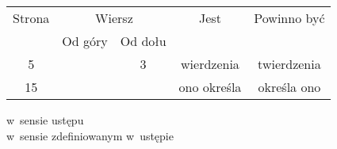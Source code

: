 \documentclass[a4paper,11pt]{article}
\begin{document}


\begin{center}

  \begin{tabular}{|c|c|c|c|c|}
    \hline
    Strona & \multicolumn{2}{c|}{Wiersz} & Jest
                              & Powinno być \\ \cline{2-3}
    & Od góry & Od dołu & & \\
    \hline
    5   & &  3 & wierdzenia & twierdzenia \\
    15  & & & ono określa & określa ono \\
    \hline
  \end{tabular}

\end{center}

\vspace{\VerSpaceSix}


\noindent
{}
\Jest  w~sensie ustępu \\
\Powin w~sensie zdefiniowanym w~ustępie \\












{}






\end{document}
